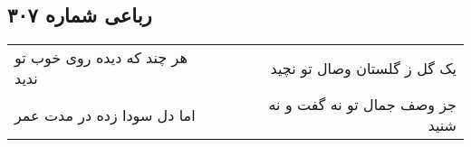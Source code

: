 \begin{center}
\section*{رباعی شماره ۳۰۷}
\label{sec:sh307}
\begin{longtable}{l p{0.5cm} r}
هر چند که دیده روی خوب تو ندید
&&
یک گل ز گلستان وصال تو نچید
\\
اما دل سودا زده در مدت عمر
&&
جز وصف جمال تو نه گفت و نه شنید
\\
\end{longtable}
\end{center}
